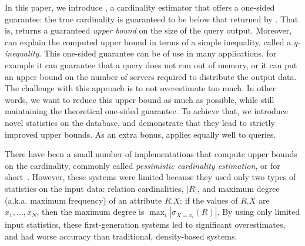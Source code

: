 In this paper, we introduce \system, a cardinality estimator 
that offers a one-sided guarantee: the true cardinality is guaranteed
to be below that returned by \system.  That is, \system returns
a guaranteed \emph{upper bound} on the size of the query  output.
Moreover, \system can explain the computed upper bound in terms of a
simple inequality, called a \emph{q-inequality}.  This one-sided
guarantee can be of use in many applications, for example it can
guarantee that a query does not run out of memory, or it can put an
upper bound on the number of servers required to distribute the output
data.  The challenge with this approach is to not overestimate too
much.  In other words, we want to reduce this upper bound as much as
possible, while still maintaining the theoretical one-sided guarantee.
To achieve that, we introduce novel statistics on the database, and
demonstrate that they lead to strictly improved upper bounds.  As an
extra bonus, \system applies equally well to \groupby queries.

There have been a small number of implementations that compute upper
bounds on the cardinality, commonly called \emph{pessimistic
  cardinality estimation}, or \pce for
short~\cite{DBLP:conf/sigmod/CaiBS19,DBLP:journals/pvldb/ChenHWSS22,DBLP:journals/tods/MhedhbiKS21}.
However, these systems were limited because they used only two types
of statistics on the input data: relation cardinalities, $|R|$, and
maximum degree (a.k.a.  maximum frequency) of an attribute $R.X$: if
the values of $R.X$ are $x_1, \ldots, x_N$, then the maximum degree is
$\max_i |\sigma_{X=x_i}(R)|$.  By using only limited input statistics,
these first-generation \pce systems led to significant overestimates,
and had worse accuracy than traditional, density-based \ce systems.

